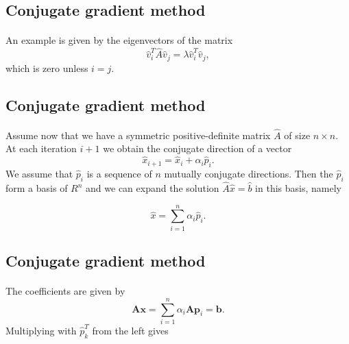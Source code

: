 \documentclass[%
twoside,                 %
final,                   %
10pt]{article}
\begin{document}
\subsection*{Conjugate gradient method}

\paragraph{}
An example is given by the eigenvectors of the matrix
\begin{equation*}
\hat{v}_i^T\hat{A}\hat{v}_j= \lambda\hat{v}_i^T\hat{v}_j,
\end{equation*}
which is zero unless $i=j$.




\subsection*{Conjugate gradient method}

\paragraph{}
Assume now that we have a symmetric positive-definite matrix $\hat{A}$ of size
$n\times n$. At each iteration $i+1$ we obtain the conjugate direction of a vector
\begin{equation*}
\hat{x}_{i+1}=\hat{x}_{i}+\alpha_i\hat{p}_{i}. 
\end{equation*}
We assume that $\hat{p}_{i}$ is a sequence of $n$ mutually conjugate directions. 
Then the $\hat{p}_{i}$  form a basis of $R^n$ and we can expand the solution 
$  \hat{A}\hat{x} = \hat{b}$ in this basis, namely

\begin{equation*}
  \hat{x}  = \sum^{n}_{i=1} \alpha_i \hat{p}_i.
\end{equation*}



\subsection*{Conjugate gradient method}

\paragraph{}
The coefficients are given by
\begin{equation*}
    \mathbf{A}\mathbf{x} = \sum^{n}_{i=1} \alpha_i \mathbf{A} \mathbf{p}_i = \mathbf{b}.
\end{equation*}
Multiplying with $\hat{p}_k^T$  from the left gives
\end{document}
